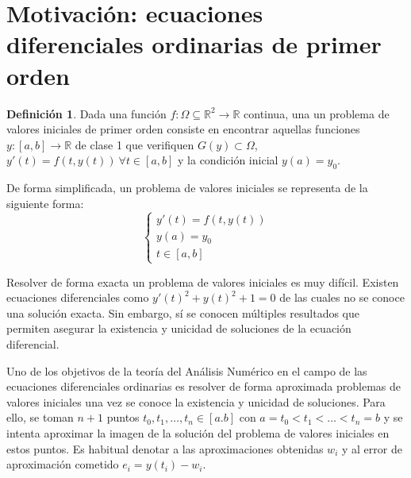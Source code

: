 \documentclass{article}
\theoremstyle{theorem-style}  %
\theoremstyle{definition}
\newtheorem{definition}{Definición}[section]
\theoremstyle{example-style}
\begin{document}
\maketitle



\newpage
\tableofcontents
\newpage


\section{Motivación: ecuaciones diferenciales ordinarias de primer orden} \label{sec:motivacion}

	\begin{definition} 
		Dada una función $f:\Omega \subseteq \mathbb R^2  \to \mathbb{R}$ continua, una un problema de valores iniciales de primer orden consiste en encontrar aquellas funciones $y: [a,b] \rightarrow \mathbb{R}$ de clase 1 que verifiquen $G(y) \subset \Omega$, $y'(t) = f(t,y(t)) \ \forall t \in [a,b]$ y la condición inicial $y(a) = y_0$.  
	\end{definition}

	De forma simplificada, un problema de valores iniciales se representa de la siguiente forma: 
	\begin{equation*}
		\begin{cases}
			y'(t) = f(t,y(t)) \\
			y(a) = y_0 \\
			t \in [a,b]
		\end{cases}
	\end{equation*}

	Resolver de forma exacta un problema de valores iniciales es muy difícil. Existen ecuaciones diferenciales como $y'(t)^2 + y(t)^2 + 1 = 0$ de las cuales no se conoce una solución exacta. Sin embargo, sí se conocen múltiples resultados que permiten asegurar la existencia y unicidad de soluciones de la ecuación diferencial.


	Uno de los objetivos de la teoría del Análisis Numérico en el campo de las ecuaciones diferenciales ordinarias es resolver de forma aproximada problemas de valores iniciales una vez se conoce la existencia y unicidad de soluciones. Para ello, se toman $n+1$ puntos $t_0, t_1, \ldots, t_n \in [a.b]$ con $a = t_0 < t_1 < \ldots < t_n = b$ y se intenta aproximar la imagen de la solución del problema de valores iniciales en estos puntos. Es habitual denotar a las aproximaciones obtenidas $w_i$ y al error de aproximación cometido $e_i = y(t_i) - w_i$.
\end{document}
